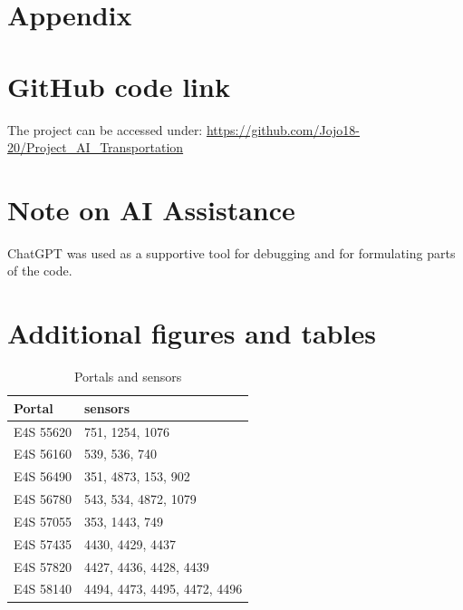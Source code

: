 	
	
	
	\newpage
	\appendix
	\section*{Appendix}
	\section{GitHub code link}
	The project can be accessed under:
	\url{https://github.com/Jojo18-20/Project_AI_Transportation}
	\section{Note on AI Assistance}
	ChatGPT was used as a supportive tool for debugging and for formulating parts of the code.
	\section{ Additional figures and tables}
		\begin{table}[H]
		\centering
		\caption{Portals and sensors}
		\label{tab:portalsandsensors}
		\begin{tabular}{|l|l|}
			\hline
			Portal & sensors \\
			\hline
			E4S 55620 & 751, 1254, 1076 \\
			E4S 56160 & 539, 536, 740 \\
			E4S 56490 & 351, 4873, 153, 902 \\
			E4S 56780 & 543, 534, 4872, 1079 \\
			E4S 57055 & 353, 1443, 749 \\
			E4S 57435 & 4430, 4429, 4437 \\
			E4S 57820 & 4427, 4436, 4428, 4439 \\
			E4S 58140 & 4494, 4473, 4495, 4472, 4496 \\
			\hline
		\end{tabular}
	\end{table}
	

